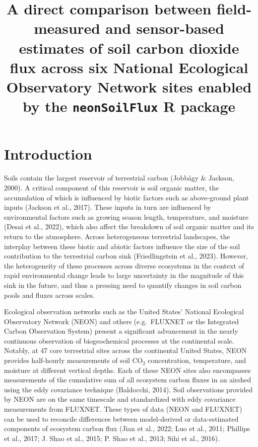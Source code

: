 \documentclass[
  letterpaper,
  DIV=11,
  numbers=noendperiod]{scrartcl}
\title{A direct comparison between field-measured and sensor-based
estimates of soil carbon dioxide flux across six National Ecological
Observatory Network sites enabled by the \texttt{neonSoilFlux} R
package}
\author{}
\date{}
\begin{document}
\maketitle


\section{Introduction}\label{introduction}

Soils contain the largest reservoir of terrestrial carbon (Jobbágy \&
Jackson, 2000). A critical component of this reservoir is soil organic
matter, the accumulation of which is influenced by biotic factors such
as above-ground plant inputs (Jackson et al., 2017). These inputs in
turn are influenced by environmental factors such as growing season
length, temperature, and moisture (Desai et al., 2022), which also
affect the breakdown of soil organic matter and its return to the
atmosphere. Across heterogeneous terrestrial landscapes, the interplay
between these biotic and abiotic factors influence the size of the soil
contribution to the terrestrial carbon sink (Friedlingstein et al.,
2023). However, the heterogeneity of these processes across diverse
ecosystems in the context of rapid environmental change leads to large
uncertainty in the magnitude of this sink in the future, and thus a
pressing need to quantify changes in soil carbon pools and fluxes across
scales.

Ecological observation networks such as the United States' National
Ecological Observatory Network (NEON) and others (e.g.~FLUXNET or the
Integrated Carbon Observation System) present a significant advancement
in the nearly continuous observation of biogeochemical processes at the
continental scale. Notably, at 47 core terrestrial sites across the
continental United States, NEON provides half-hourly measurements of
soil CO\(_{2}\) concentration, temperature, and moisture at different
vertical depths. Each of these NEON sites also encompasses measurements
of the cumulative sum of all ecosystem carbon fluxes in an airshed using
the eddy covariance technique (Baldocchi, 2014). Soil observations
provided by NEON are on the same timescale and standardized with eddy
covariance measurements from FLUXNET. These types of data (NEON and
FLUXNET) can be used to reconcile differences between model-derived or
data-estimated components of ecosystem carbon flux (Jian et al., 2022;
Luo et al., 2011; Phillips et al., 2017; J. Shao et al., 2015; P. Shao
et al., 2013; Sihi et al., 2016).
\end{document}
